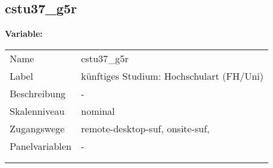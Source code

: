 	
	
	\subsection{cstu37\_g5r}
	\label{subSection:cstu37_g5r}

	\noindent\textbf{Variable:}\\
		\begin{tabular}{lL{11.3cm}}
			\label{tableVariable:cstu37_g5r}
			Name & cstu37\_g5r \\
			Label & künftiges Studium: Hochschulart (FH/Uni) \\
			Beschreibung & - \\
			Skalenniveau & nominal \\
			Zugangswege &
				remote-desktop-suf,
				onsite-suf,
 \\
			Panelvariablen & -
			 \\
			 \\
 \\
		\end{tabular}






